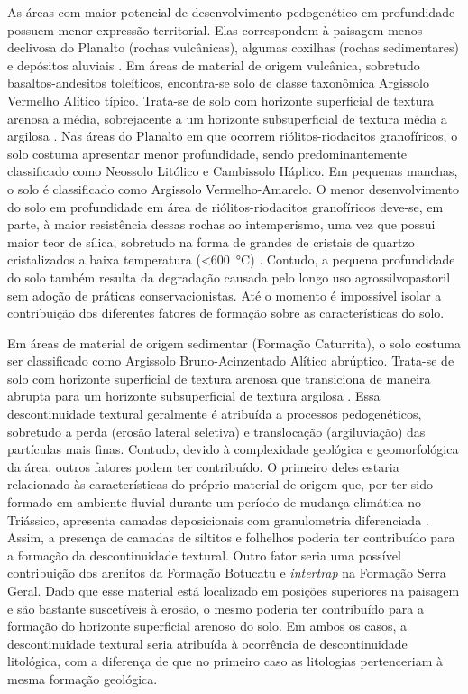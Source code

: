 As áreas com maior potencial de desenvolvimento pedogenético em profundidade possuem menor expressão 
territorial. Elas correspondem à paisagem menos declivosa do Planalto (rochas vulcânicas), algumas coxilhas 
(rochas sedimentares) e depósitos aluviais \cite{Miguel2010}. Em áreas de material de origem vulcânica, 
sobretudo basaltos-andesitos toleíticos, encontra-se solo de classe taxonômica Argissolo Vermelho Alítico 
típico. Trata-se de solo com horizonte superficial de textura arenosa a média, sobrejacente a um horizonte 
subsuperficial de textura média a argilosa \cite{Miguel2010}. Nas áreas do Planalto em que ocorrem 
riólitos-riodacitos granofíricos, o solo costuma apresentar menor profundidade, sendo predominantemente 
classificado como Neossolo Litólico e Cambissolo Háplico. Em pequenas manchas, o solo é classificado como 
Argissolo Vermelho-Amarelo. O menor desenvolvimento do solo em profundidade em área de riólitos-riodacitos 
granofíricos deve-se, em parte, à maior resistência dessas rochas ao intemperismo, uma vez que possui maior 
teor de sílica, sobretudo na forma de grandes de cristais de quartzo cristalizados a baixa temperatura 
(\SI{<600}{\celsius}) \cite{Pedron2007}. Contudo, a pequena profundidade do solo também resulta da degradação 
causada pelo longo uso agrossilvopastoril sem adoção de práticas conservacionistas. Até o momento é impossível 
isolar a contribuição dos diferentes fatores de formação sobre as características do solo.

Em áreas de material de origem sedimentar (Formação Caturrita), o solo costuma ser classificado como 
Argissolo Bruno-Acinzentado Alítico abrúptico. Trata-se de solo com horizonte superficial de textura arenosa 
que transiciona de maneira abrupta para um horizonte subsuperficial de textura argilosa \cite{Miguel2010}. 
Essa descontinuidade textural geralmente é atribuída a processos pedogenéticos, sobretudo a perda (erosão 
lateral seletiva) e translocação (argiluviação) das partículas mais finas. Contudo, devido à complexidade 
geológica e geomorfológica da área, outros fatores podem ter contribuído. O primeiro deles estaria relacionado 
às características do próprio material de origem que, por ter sido formado em ambiente fluvial durante um 
período de mudança climática no Triássico, apresenta camadas deposicionais com granulometria diferenciada 
\cite{PieriniEtAl2002}. Assim, a presença de camadas de siltitos e folhelhos poderia ter contribuído para a 
formação da descontinuidade textural. Outro fator seria uma possível contribuição dos arenitos da Formação 
Botucatu e \emph{intertrap} na Formação Serra Geral. Dado que esse material está localizado em posições 
superiores na paisagem e são bastante suscetíveis à erosão, o mesmo poderia ter contribuído para a formação do 
horizonte superficial arenoso do solo. Em ambos os casos, a descontinuidade textural seria atribuída à 
ocorrência de descontinuidade litológica, com a diferença de que no primeiro caso as litologias pertenceriam à 
mesma formação geológica.

